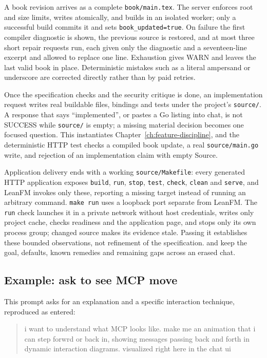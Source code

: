 A book revision arrives as a complete \texttt{book/main.tex}. The server enforces
root and size limits, writes atomically, and builds in an isolated worker; only a
successful build commits it and sets \texttt{book\_updated=true}. On failure the
first compiler diagnostic is shown, the previous source is restored, and at most
three short repair requests run, each given only the diagnostic and a
seventeen-line excerpt and allowed to replace one line. Exhaustion gives WARN and
leaves the last valid book in place. Deterministic mistakes such as a literal
ampersand or underscore are corrected directly rather than by paid retries.

Once the specification checks and the security critique is done, an
implementation request writes real buildable files, bindings and tests under the
project's \texttt{source/}. A response that says ``implemented'', or pastes a Go
listing into chat, is not SUCCESS while \texttt{source/} is empty; a missing
material decision becomes one focused question. This instantiates
Chapter~\ref{ch:feature-discipline}, and the deterministic HTTP test checks a
compiled book update, a real \texttt{source/main.go} write, and rejection of an
implementation claim with empty Source.

Application delivery ends with a working \texttt{source/Makefile}: every
generated HTTP application exposes \texttt{build}, \texttt{run}, \texttt{stop},
\texttt{test}, \texttt{check}, \texttt{clean} and \texttt{serve}, and LeanFM
invokes only these, reporting a missing target instead of running an arbitrary
command. \texttt{make run} uses a loopback port separate from LeanFM. The
\texttt{run} check launches it in a private network without host credentials,
writes only project cache, checks readiness and the application page, and stops
only its own process group; changed source makes its evidence stale. Passing it
establishes these bounded observations, not refinement of the specification.
 and  keep the goal, defaults,
known remedies and remaining gaps across an erased chat.

\subsection{Example: ask to see MCP move}

This prompt asks for an explanation and a specific interaction technique,
reproduced as entered:

\begin{quote}\ttfamily
i want to understand what MCP looks like. make me an animation that i can step
forwrd or back in, showing messages passing back and forth in dynamic
interaction diagrams. visualized right here in the chat ui
\end{quote}

